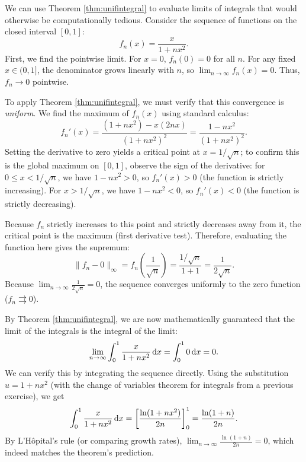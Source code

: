 \documentclass[../analysis1.tex]{subfiles}
\begin{document}
\begin{example}
    We can use Theorem \ref{thm:unifintegral} to evaluate limits of integrals that would otherwise be computationally tedious. Consider the sequence of functions on the closed interval $[0,1]$:
    \[
        f_n(x) = \frac{x}{1 + nx^2}.
    \]
    First, we find the pointwise limit. For $x = 0$, $f_n(0) = 0$ for all $n$. For any fixed $x \in (0,1]$, the denominator grows linearly with $n$, so $\lim_{n \to \infty} f_n(x) = 0$. Thus, $f_n \to 0$ pointwise.
    
    To apply Theorem \ref{thm:unifintegral}, we must verify that this convergence is \textit{uniform}. We find the maximum of $f_n(x)$ using standard calculus:
    \[
        f_n'(x) = \frac{(1+nx^2) - x(2nx)}{(1+nx^2)^2} = \frac{1 - nx^2}{(1+nx^2)^2}.
    \]
    Setting the derivative to zero yields a critical point at $x = 1/\sqrt{n}$; to confirm this is the global maximum on $[0,1]$, observe the sign of the derivative: for $0 \le x < 1/\sqrt{n}$, we have $1 - nx^2 > 0$, so $f_n'(x) > 0$ (the function is strictly increasing). For $x > 1/\sqrt{n}$, we have $1 - nx^2 < 0$, so $f_n'(x) < 0$ (the function is strictly decreasing). 
    
    Because $f_n$ strictly increases to this point and strictly decreases away from it, the critical point is the maximum (first derivative test). Therefore, evaluating the function here gives the supremum:
    \[
        \|f_n - 0\|_\infty = f_n\left(\frac{1}{\sqrt{n}}\right) = \frac{1/\sqrt{n}}{1 + 1} = \frac{1}{2\sqrt{n}}.
    \]
    Because $\lim_{n \to \infty} \frac{1}{2\sqrt{n}} = 0$, the sequence converges uniformly to the zero function ($f_n \rightrightarrows 0$).
    
    By Theorem \ref{thm:unifintegral}, we are now mathematically guaranteed that the limit of the integrals is the integral of the limit:
    \[
        \lim_{n \to \infty} \int_0^1 \frac{x}{1 + nx^2} \d{x} = \int_0^1 0 \d{x} = 0.
    \]
     We can verify this by integrating the sequence directly. Using the substitution $u = 1+nx^2$ (with the change of variables theorem for integrals from a previous exercise), we get
    \[
        \int_0^1 \frac{x}{1 + nx^2} \d{x} = \left[ \frac{\ln(1+nx^2)}{2n} \right]_0^1 = \frac{\ln(1+n)}{2n}.
    \]
    By L'H\^{o}pital's rule (or comparing growth rates), $\lim_{n \to \infty} \frac{\ln(1+n)}{2n} = 0$, which indeed matches the theorem's prediction.
\end{example}
\end{document}
